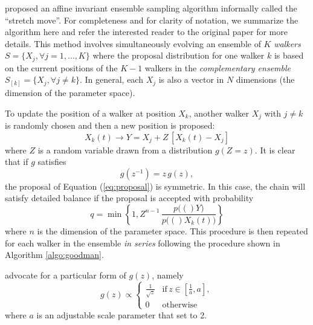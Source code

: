 \documentclass[12pt,preprint]{aastex}
\newcommand{\eq}[1]{Equation (\ref{eq:#1})}
\newcommand{\eqlabel}[1]{\label{eq:#1}}
\newcommand{\algo}[1]{Algorithm \ref{algo:#1}}
\newcommand{\ensemble}{S}
\renewcommand{\vector}[1]{#1}
\newcommand{\pr}[1]{\ensuremath{p(#1)}}
\begin{document}
 proposed an affine invariant ensemble sampling
algorithm informally called the ``stretch move''. For completeness and for
clarity of notation, we summarize the algorithm here and refer the interested
reader to the original paper for more details. This method involves
simultaneously evolving an ensemble of $K$ \emph{walkers}
$\ensemble = \{ \vector{X_j}, \forall j=1,\ldots,K \}$ where the proposal
distribution for one walker $k$ is based on the current positions of the
$K-1$ walkers in the \emph{complementary ensemble}
$\ensemble_{[k]} = \{ \vector{X_j}, \forall j \ne k \}$. In general, each
$\vector{X_j}$ is also a vector in $N$ dimensions (the dimension
of the parameter space).

To update the position of a walker at position $\vector{X_k}$,
another walker $\vector{X_j}$ with $j \ne k$ is randomly chosen and then
a new position is proposed:
\begin{equation}
    \eqlabel{proposal}
    \vector{X_k} (t) \to \vector{Y} = \vector{X_j}
            + Z \, [\vector{X_k} (t) - \vector{X_j}]
\end{equation}
where $Z$ is a random variable drawn from a distribution $g(Z = z)$.
It is clear that if $g$ satisfies
\begin{equation}
    g(z^{-1}) = z \, g(z),
\end{equation}
the proposal of \eq{proposal} is symmetric. In this case, the chain will
satisfy detailed balance if the proposal is accepted with probability
\begin{equation}
    \eqlabel{acceptance}
    q = \min \left \{ 1, Z^{n-1} \,
                \frac{\pr(\vector{Y})}{\pr(\vector{X_k} (t))} \right \}
\end{equation}
where $n$ is the dimension of the parameter space. This procedure is then
repeated for each walker in the ensemble \emph{in series} following the
procedure shown in \algo{goodman}.

 advocate for a particular form of $g(z)$, namely
\begin{equation}
    \eqlabel{goodmanprop}
    g(z) \propto \left \{ \begin{array}{ll}
        \displaystyle\frac{1}{\sqrt{z}} & \mathrm{if}\, z\in
                        \left [ \displaystyle\frac{1}{a}, a \right ], \\
        0 & \mathrm{otherwise}
    \end{array} \right .
\end{equation}
where $a$ is an adjustable scale parameter that  set
to 2.
\end{document}
